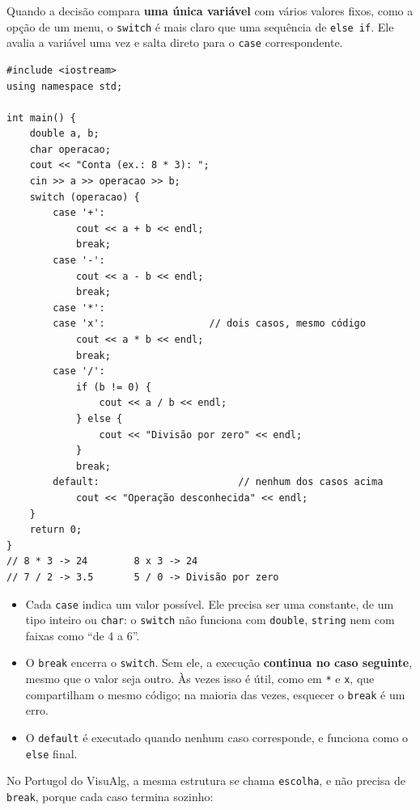 Quando a decisão compara \textbf{uma única variável} com vários valores fixos, como a opção de um menu, o \texttt{switch} é mais claro que uma sequência de \texttt{else if}. Ele avalia a variável uma vez e salta direto para o \texttt{case} correspondente.

\begin{codigo}
\begin{Verbatim}[breaklines=true, breaksymbolleft={}, fontsize=\footnotesize]
#include <iostream>
using namespace std;

int main() {
    double a, b;
    char operacao;
    cout << "Conta (ex.: 8 * 3): ";
    cin >> a >> operacao >> b;
    switch (operacao) {
        case '+':
            cout << a + b << endl;
            break;
        case '-':
            cout << a - b << endl;
            break;
        case '*':
        case 'x':                  // dois casos, mesmo código
            cout << a * b << endl;
            break;
        case '/':
            if (b != 0) {
                cout << a / b << endl;
            } else {
                cout << "Divisão por zero" << endl;
            }
            break;
        default:                        // nenhum dos casos acima
            cout << "Operação desconhecida" << endl;
    }
    return 0;
}
// 8 * 3 -> 24        8 x 3 -> 24
// 7 / 2 -> 3.5       5 / 0 -> Divisão por zero
\end{Verbatim}
\end{codigo}

\begin{itemize}
  \item Cada \texttt{case} indica um valor possível. Ele precisa ser uma constante, de um tipo inteiro ou \texttt{char}: o \texttt{switch} não funciona com \texttt{double}, \texttt{string} nem com faixas como ``de 4 a 6''.
  \item O \texttt{break} encerra o \texttt{switch}. Sem ele, a execução \textbf{continua no caso seguinte}, mesmo que o valor seja outro. Às vezes isso é útil, como em \texttt{\textquotesingle{}*\textquotesingle{}} e \texttt{\textquotesingle{}x\textquotesingle{}}, que compartilham o mesmo código; na maioria das vezes, esquecer o \texttt{break} é um erro.
  \item O \texttt{default} é executado quando nenhum caso corresponde, e funciona como o \texttt{else} final.
\end{itemize}

No Portugol do VisuAlg, a mesma estrutura se chama \texttt{escolha}, e não precisa de \texttt{break}, porque cada caso termina sozinho:

